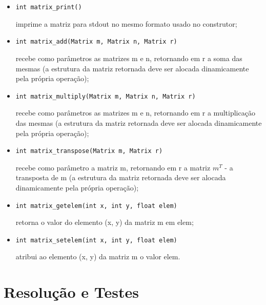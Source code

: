 \documentclass[a4paper,10pt]{article}
\begin{document}
\begin{itemize}
  \item[] \begin{verbatim}int matrix_print()\end{verbatim} imprime a matriz para stdout no mesmo formato usado no construtor;
  \item[] \begin{verbatim}int matrix_add(Matrix m, Matrix n, Matrix r)\end{verbatim} recebe como parâmetros as matrizes m e n, retornando em r a soma das mesmas (a estrutura da matriz retornada deve ser alocada dinamicamente pela própria operação);
  \item[] \begin{verbatim}int matrix_multiply(Matrix m, Matrix n, Matrix r)\end{verbatim} recebe como parâmetros as matrizes m e n, retornando em r a multiplicação das mesmas (a estrutura da matriz retornada deve ser alocada dinamicamente pela própria operação);
  \item[] \begin{verbatim}int matrix_transpose(Matrix m, Matrix r)\end{verbatim} recebe como parâmetro a matriz m, retornando em r a matriz $m^{T}$ - a transposta de m (a estrutura da matriz retornada deve ser alocada dinamicamente pela própria operação);
  \item[] \begin{verbatim}int matrix_getelem(int x, int y, float elem)\end{verbatim} retorna o valor do elemento (x, y) da matriz m em elem;
  \item[] \begin{verbatim}int matrix_setelem(int x, int y, float elem)\end{verbatim} atribui ao elemento (x, y) da matriz m o valor elem.
\end{itemize}





\section*{Resolução e Testes}
\end{document}
